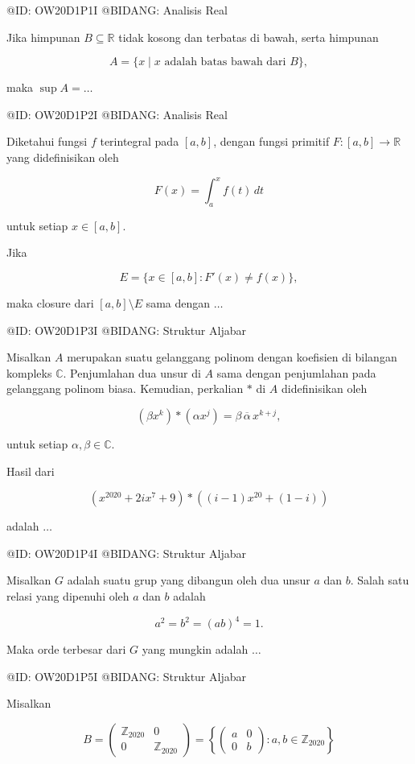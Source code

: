 @ID: OW20D1P1I
@BIDANG: Analisis Real

Jika himpunan $B\subseteq\mathbb R$ tidak kosong dan terbatas di bawah, serta himpunan

$$
A=\{x\mid x \text{ adalah batas bawah dari } B\},
$$

maka $\sup A=\ldots$

@ID: OW20D1P2I
@BIDANG: Analisis Real

Diketahui fungsi $f$ terintegral pada $[a,b]$, dengan fungsi primitif $F:[a,b]\to\mathbb R$ yang didefinisikan oleh

$$
F(x)=\int_a^x f(t)\,dt
$$

untuk setiap $x\in[a,b]$.

Jika

$$
E=\{x\in[a,b]:F'(x)\ne f(x)\},
$$

maka closure dari $[a,b]\setminus E$ sama dengan $\ldots$

@ID: OW20D1P3I
@BIDANG: Struktur Aljabar

Misalkan $A$ merupakan suatu gelanggang polinom dengan koefisien di bilangan kompleks $\mathbb C$. Penjumlahan dua unsur di $A$ sama dengan penjumlahan pada gelanggang polinom biasa. Kemudian, perkalian $*$ di $A$ didefinisikan oleh

$$
(\beta x^k)*(\alpha x^j)=\beta\,\overline{\alpha}\,x^{k+j},
$$

untuk setiap $\alpha,\beta\in\mathbb C$.

Hasil dari

$$
(x^{2020}+2ix^7+9)*((i-1)x^{20}+(1-i))
$$

adalah $\ldots$

@ID: OW20D1P4I
@BIDANG: Struktur Aljabar

Misalkan $G$ adalah suatu grup yang dibangun oleh dua unsur $a$ dan $b$. Salah satu relasi yang dipenuhi oleh $a$ dan $b$ adalah

$$
a^2=b^2=(ab)^4=1.
$$

Maka orde terbesar dari $G$ yang mungkin adalah $\ldots$

@ID: OW20D1P5I
@BIDANG: Struktur Aljabar

Misalkan

$$
B=
\begin{pmatrix}
\mathbb Z_{2020} & 0\\
0 & \mathbb Z_{2020}
\end{pmatrix}
=
\left\{
\begin{pmatrix}
a&0\\
0&b
\end{pmatrix}
:a,b\in\mathbb Z_{2020}
\right\}
$$

